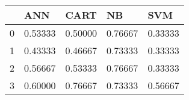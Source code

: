 \begin{tabular}{|l|l|l|l|l|}
\toprule
{} &      ANN &     CART &       NB &      SVM \\
\midrule
0 &  0.53333 &  0.50000 &  0.76667 &  0.33333 \\
1 &  0.43333 &  0.46667 &  0.73333 &  0.33333 \\
2 &  0.56667 &  0.53333 &  0.76667 &  0.33333 \\
3 &  0.60000 &  0.76667 &  0.73333 &  0.56667 \\
\bottomrule
\end{tabular}
